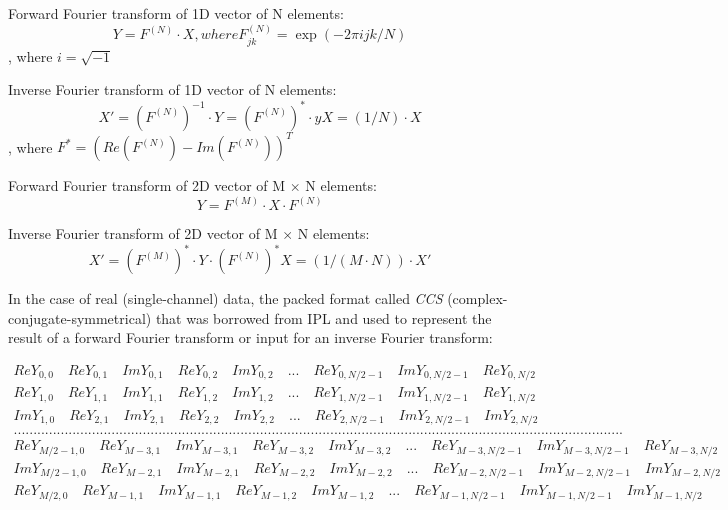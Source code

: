 Forward Fourier transform of 1D vector of N elements:
\[Y = F^{(N)} \cdot X, where F^{(N)}_{jk}=\exp(-2\pi i j k/N)\], 
where $i=\sqrt{-1}$

Inverse Fourier transform of 1D vector of N elements:
\[X'= (F^{(N)})^{-1} \cdot Y = (F^{(N)})^* \cdot y
X = (1/N) \cdot X\], where $F^*=(Re(F^{(N)})-Im(F^{(N)}))^T$

Forward Fourier transform of 2D vector of M $\times$ N elements:
\[Y = F^{(M)} \cdot X \cdot F^{(N)}\]

Inverse Fourier transform of 2D vector of M $\times$ N elements:
\[X'= (F^{(M)})^* \cdot Y \cdot (F^{(N)})^*
X = (1/(M \cdot N)) \cdot X'\]

In the case of real (single-channel) data, the packed format called \emph{CCS} (complex-conjugate-symmetrical) that was borrowed from IPL and used to represent the result of a forward Fourier transform or input for an inverse Fourier transform:

\[\begin{array}{l}
Re Y_{0,0} \quad     Re Y_{0,1}  \quad  Im Y_{0,1}  \quad  Re Y_{0,2}     \quad Im Y_{0,2} \quad ...  \quad Re Y_{0,N/2-1} \quad  Im Y_{0,N/2-1} \quad Re Y_{0,N/2} \\

Re Y_{1,0}  \quad    Re Y_{1,1}  \quad  Im Y_{1,1}   \quad Re Y_{1,2}   \quad  Im Y_{1,2} \quad ... \quad Re Y_{1,N/2-1}  \quad Im Y_{1,N/2-1} \quad Re Y_{1,N/2} \\

Im Y_{1,0}    \quad  Re Y_{2,1}  \quad  Im Y_{2,1} \quad   Re Y_{2,2}  \quad   Im Y_{2,2} \quad ... \quad Re Y_{2,N/2-1}  \quad Im Y_{2,N/2-1} \quad Im Y_{2,N/2} \\
............................................................................................................................................................ \\
Re Y_{M/2-1,0} \quad  Re Y_{M-3,1}  \quad Im Y_{M-3,1} \quad Re Y_{M-3,2} \quad  Im Y_{M-3,2} \quad... \quad Re Y_{M-3,N/2-1} \quad Im Y_{M-3,N/2-1}\quad Re Y_{M-3,N/2} \\
Im Y_{M/2-1,0} \quad  Re Y_{M-2,1}  \quad Im Y_{M-2,1} \quad Re Y_{M-2,2} \quad  Im Y_{M-2,2} \quad... \quad Re Y_{M-2,N/2-1} \quad Im Y_{M-2,N/2-1}\quad Im Y_{M-2,N/2} \\
Re Y_{M/2,0}  \quad  Re Y_{M-1,1} \quad  Im Y_{M-1,1} \quad Re Y_{M-1,2} \quad  Im Y_{M-1,2} \quad ... \quad Re Y_{M-1,N/2-1} \quad Im Y_{M-1,N/2-1}\quad Im Y_{M-1,N/2}
\end{array}
\]

